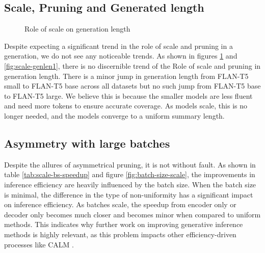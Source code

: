 \subsection{Scale, Pruning and Generated length}
\begin{figure}
    \centering
  \caption{Role of scale on generation length}
    \label{fig:scale-genlen}
\end{figure}
Despite expecting a significant trend in the role of scale and pruning in a generation, we do not see any noticeable trends. As shown in figures \ref{fig:scale-genlen} and \ref{fig:scale-genlen1}, there is no discernible trend of the Role of scale and pruning in generation length. There is a minor jump in generation length from FLAN-T5 small to FLAN-T5 base across all datasets but no such jump from FLAN-T5 base to FLAN-T5 large. We believe this is because the smaller models are less fluent and need more tokens to ensure accurate coverage. As models scale, this is no longer needed, and the models converge to a uniform summary length. 
\subsection{Asymmetry with large batches}
Despite the allures of asymmetrical pruning, it is not without fault. As shown in table \ref{tab:scale-bs-speedup} and figure \ref{fig:batch-size-scale}, the improvements in inference efficiency are heavily influenced by the batch size. When the batch size is minimal, the difference in the type of non-uniformity has a significant impact on inference efficiency. As batches scale, the speedup from encoder only or decoder only becomes much closer and becomes minor when compared to uniform methods. This indicates why further work on improving generative inference methods is highly relevant, as this problem impacts other efficiency-driven processes like CALM \cite{Schuster2022ConfidentAL}.